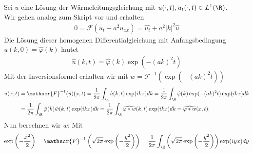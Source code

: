 \begin{solution}

Sei $u$ eine Lösung der Wärmeleitungsgleichung mit $u(\cdot,t), u_t(\cdot,t) \in L^1(\R)$. \\
Wir gehen analog zum Skript vor und erhalten
\begin{align*}
0 = \mathscr{F}(u_t - a^2u_{xx}) = \hat{u_t} + a^2|k|^2\hat{u}
\end{align*}
Die Lösung dieser homogenen Differentialgleichung mit Anfangsbedingung $\hat{u}(k,0) = \hat{\varphi}(k)$ lautet
\begin{align*}
  \hat{u}(k,t) = \hat{\varphi}(k)\exp(-(ak)^2t)
\end{align*}
Mit der Inversionsformel erhalten wir mit $w = \mathscr{F}^{-1}(\exp(-(ak)^2t))$
\begin{align*}
  u(x,t) &= \mathscr{F}^{-1}(\hat{u})(x,t) = \frac{1}{2\pi}\int_\R \hat{u}(k,t)\exp(ikx)dk
  = \frac{1}{2\pi}\int_\R \hat{\varphi}(k)\exp(-(ak)^2t)\exp(ikx)dk \\
  &= \frac{1}{2\pi}\int_\R \hat{\varphi}(k)\hat{w}(k,t)\exp(ikx)dk
  = \frac{1}{2\pi}\int_\R \widehat{\varphi \ast w}(k,t)\exp(ikx)dk
  = \widehat{\varphi \ast w}(x,t).
\end{align*}
Nun berechnen wir $w$: Mit
\begin{align*}
  \exp\left(-\frac{x^2}{2}\right) = \mathscr{F}^{-1}\left(\sqrt{2\pi}\exp\left(-\frac{y^2}{2}\right)\right)
  = \frac{1}{2\pi}\int_\R \left(\sqrt{2\pi}\exp\left(-\frac{y^2}{2}\right)\right)\exp(iyx) dy
\end{align*}


\end{solution}
